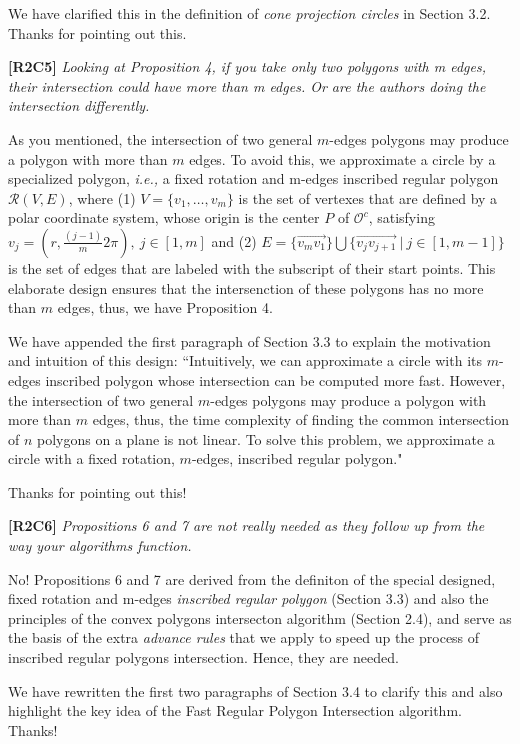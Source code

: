\documentclass{letter}
\newcommand{\ie}{\emph{i.e.,}\xspace}
\newcommand{\pcircle}[1]{{$\mathcal{O}^c{#1}$}}
\begin{document}
We have clarified this in the definition of \emph{cone projection circles} in Section 3.2. Thanks for pointing out this.

\textbf{[R2C5]} \emph{Looking at Proposition 4, if you take only two polygons with m edges, their intersection could have more than m edges. Or are the authors doing the intersection differently.}

As you mentioned, the intersection of two {general} $m$-edges polygons may produce a polygon with more than $m$ edges. To avoid this, we approximate a circle by a {specialized} polygon, \ie a fixed rotation and m-edges inscribed regular polygon $\mathcal{R}(V, E)$,
where (1) $V=\{v_1, \ldots, v_{m}\}$ is the set of vertexes that are defined by a polar coordinate system, whose origin is the center $P$ of \pcircle{}, satisfying $v_j = (r, \frac{(j-1)}{m}2\pi), ~j \in [1, m]$
and (2) $E= \{\overrightarrow{v_mv_1}\} \bigcup \{\overrightarrow{v_jv_{j+1}}\ |\ j\in [1, m-1]\}$ is the set of edges that are labeled with the subscript of their start points.
This elaborate design ensures that the intersenction of these polygons has no more than $m$ edges, thus, we have Proposition 4.

We have appended the first paragraph of Section 3.3 to explain the motivation and intuition of this design: ``Intuitively, we can approximate a circle with its $m$-edges inscribed polygon {whose intersection can be computed more fast}. However, the intersection of two general $m$-edges polygons may produce a polygon with more than $m$ edges, thus, the time complexity of finding the common intersection of $n$ polygons on a plane is not linear. To solve this problem, we approximate a circle with a fixed rotation, $m$-edges, inscribed regular polygon."

Thanks for pointing out this!

\textbf{[R2C6]} \emph{Propositions 6 and 7 are not really needed as they follow up from the way your algorithms function.}

No! Propositions 6 and 7 are derived from the definiton of the special designed, fixed rotation and m-edges \emph{inscribed regular polygon} (Section 3.3) and also the principles of the convex polygons intersecton algorithm (Section 2.4), and serve as the basis of the extra \emph{advance rules} that we apply to speed up the process of inscribed regular polygons intersection. Hence, they are needed.
 
We have rewritten the first two paragraphs of Section 3.4 to clarify this and also highlight the key idea of the Fast Regular Polygon Intersection algorithm. Thanks!
\end{document}

